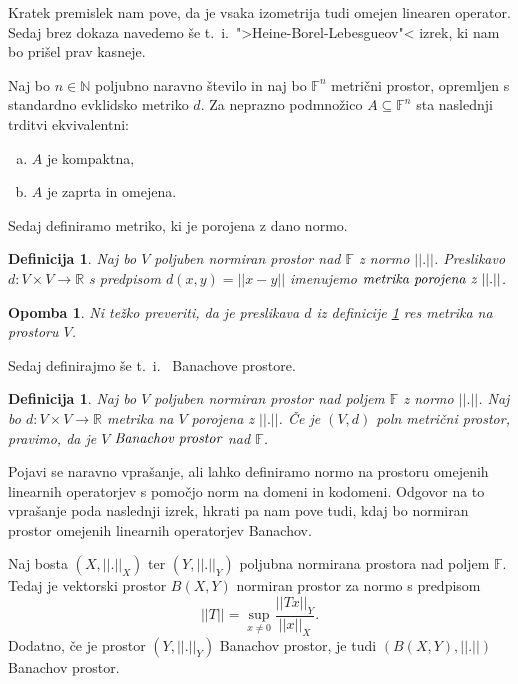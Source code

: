 \documentclass[12pt,a4paper,oneside,fleqn,openany]{book}
\newtheorem{definicija}[izrek]{Definicija}
\newtheorem{opomba}[izrek]{Opomba}
\newcommand{\R}{\mathbb{R}}
\newcommand{\F}{\mathbb{F}}
\newcommand{\N}{\mathbb{N}}
\newcommand{\abs}[1]{\ensuremath{\lvert #1 \rvert}}
\newcommand{\norm}[1]{\abs{\abs{#1}}}
\newcommand{\pojem}[1]{\ensuremath{\emph{#1}}}
\newcommand{\map}[3]{\ensuremath{{#1}:{#2}\rightarrow{#3}}}
\begin{document}
Kratek premislek nam pove, da je vsaka izometrija tudi omejen linearen operator. Sedaj brez dokaza navedemo še t.~i.~">Heine-Borel-Lebesgueov"< izrek, ki nam bo prišel prav kasneje.
\begin{izrek}
	\label{izr:HBL}
	Naj bo $n\in\N$ poljubno naravno število in naj bo $\F^n$ metrični prostor, opremljen s standardno evklidsko metriko $d$. Za neprazno podmnožico $A\subseteq \F^n$ sta naslednji trditvi ekvivalentni: \begin{enumerate}[a)]
		\item $A$ je kompaktna,
		\item $A$ je zaprta in omejena.
	\end{enumerate}
\end{izrek}
Sedaj definiramo metriko, ki je porojena z dano normo.
\begin{definicija}
	\label{def:porojmetr}
	Naj bo $V$ poljuben normiran prostor nad $\F$ z normo $\norm{.}$. Preslikavo $\map{d}{V\times V}{\R}$ s predpisom $d(x, y) = \norm{x-y}$ imenujemo \pojem{metrika porojena z $\norm{.}$}.
\end{definicija}

\begin{opomba}
	\label{opomb:porojmetr} Ni težko preveriti, da je preslikava $d$ iz definicije \ref{def:porojmetr} res metrika na prostoru $V$.
\end{opomba}
Sedaj definirajmo še t.~i.~ Banachove prostore.
\begin{definicija}
	\label{def:Banach}
	Naj bo $V$ poljuben normiran prostor nad poljem $\F$ z normo $\norm{.}$. Naj bo $\map{d}{V\times V}{\R}$ metrika na $V$ porojena z $\norm{.}$. Če je $(V, d)$ poln metrični prostor, pravimo, da je $V$ \pojem{Banachov prostor} nad $\F$. 
\end{definicija}

Pojavi se naravno vprašanje, ali lahko definiramo normo na prostoru omejenih linearnih operatorjev s pomočjo norm na domeni in kodomeni. Odgovor na to vprašanje poda naslednji izrek, hkrati pa nam pove tudi, kdaj bo normiran prostor omejenih linearnih operatorjev Banachov.

\begin{izrek}
	\label{izr:opnorm} Naj bosta $(X, \norm{.}_X)$ ter $(Y, \norm{.}_Y)$ poljubna normirana prostora nad poljem $\F$. Tedaj je vektorski prostor $B(X, Y)$ normiran prostor za normo s predpisom $$\norm{T}=\sup_{x\neq 0}\frac{\norm{Tx}_Y}{\norm{x}_X}.$$ Dodatno, če je prostor $(Y, \norm{.}_Y)$ Banachov prostor, je tudi $(B(X, Y), \norm{.})$ Banachov prostor.
\end{izrek}
\end{document}
